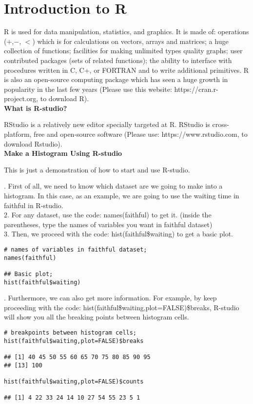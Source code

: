 \section{Introduction to R}

R is used for data manipulation, statistics, and graphics. It is made of: operations ($+$,$ -$, $<$) which is for calculations on vectors, arrays and matrices; a huge collection of functions; facilities for making unlimited types quality graphs; user contributed packages (sets of related functions); the ability to interface with procedures written in C, C+, or FORTRAN and to write additional primitives. R is also an open-source computing package which has seen a huge growth in popularity in the last few years (Please use this website: https://cran.r-project.org, to download R).\\

\noindent
\textbf{What is R-studio?}

\noindent
RStudio is a relatively new editor specially targeted at R. RStudio is cross-platform, free and open-source software (Please use: https://www.rstudio.com, to download Rstudio).\\

\noindent
\textbf{Make a Histogram Using R-studio}

\noindent
This is just a demonstration of how to start and use R-studio. 

. First of all, we need to know which dataset are we going to make into a histogram. In this case, as an example, we are going to use the waiting time in faithful in R-studio.\\
2. For any dataset, use the code: names(faithful) to get it. (inside the parentheses, type the names of variables you want in faithful dataset)\\
3. Then, we proceed with the code: hist(faithful\$waiting) to get a basic plot.\\

\begin{tcolorbox}[colback=gray!10, colframe=gray!50, arc=2mm]
\begin{verbatim}
# names of variables in faithful dataset;
names(faithful)

## Basic plot;
hist(faithful$waiting)
\end{verbatim}
\end{tcolorbox}

. Furthermore, we can also get more information. For example, by keep proceeding with the code: hist(faithful\$waiting,plot=FALSE)\$breaks, R-studio will show you all the breaking points between histogram cells.

\begin{tcolorbox}[colback=gray!10, colframe=gray!50, arc=2mm]
\begin{verbatim}
# breakpoints between histogram cells;
hist(faithful$waiting,plot=FALSE)$breaks

## [1] 40 45 50 55 60 65 70 75 80 85 90 95
## [13] 100

hist(faithful$waiting,plot=FALSE)$counts

## [1] 4 22 33 24 14 10 27 54 55 23 5 1
\end{verbatim}
\end{tcolorbox}

